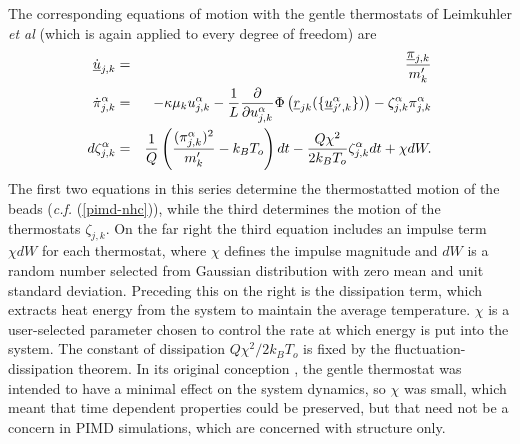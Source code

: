 The corresponding equations of motion with the gentle thermostats
of Leimkuhler {\em et al} \cite{leimkuhler-09a} (which is again
applied to every degree of freedom) are
\begin{eqnarray}
  \mbox{$\underline{\dot{u}}$}_{j,k}&=&\frac{\mbox{$\underline{\pi}$}_{j,k}}{m_{k}'} \nonumber \\
  {\dot \pi}_{j,k}^{\alpha}&=&-\kappa \mu_{k}u_{j,k}^{\alpha}-\frac{1}{L} \frac{\partial}
  {\partial u_{j,k}^{\alpha}}\Phi\left (\mbox{$\underline{r}$}_{jk}(\{\mbox{$\underline{u}$}_{j',k}^{\alpha}\})\right )-
  \zeta_{j,k}^{\alpha}{\pi}_{j,k}^{\alpha}   \label{pimd-gt} \\
  d{\zeta}_{j,k}^{\alpha}&=&\frac{1}{Q} \left (\frac{(\pi_{j,k}^{\alpha})^{2}}{m_{k}'}-k_{B}T_{o} \right )dt
  -\frac{Q\chi^{2}}{2 k_{B}T_{o}}\zeta_{j,k}^{\alpha}dt +\chi dW. \nonumber 
\end{eqnarray}
The first two equations in this series determine the thermostatted
motion of the beads ({\em c.f.} (\ref{pimd-nhc})), while the third
determines the motion of the thermostats $\zeta_{j,k}$. On the far
right the third equation includes an impulse term $\chi dW$ for each
thermostat, where $\chi$ defines the impulse magnitude and $dW$ is a
random number selected from Gaussian distribution with zero mean and
unit standard deviation. Preceding this on the right is the
dissipation term, which extracts heat energy from the system to
maintain the average temperature. $\chi$ is a user-selected
parameter chosen to control the rate at which energy is put into the
system. The constant of dissipation $Q \chi^{2}/2 k_{B}T_{o}$ is
fixed by the fluctuation-dissipation theorem. In its original
conception \cite{leimkuhler-09a}, the gentle thermostat was intended
to have a minimal effect on the system dynamics, so $\chi$ was
small, which meant that time dependent properties could be preserved,
but that need not be a concern in PIMD simulations, which are
concerned with structure only.

